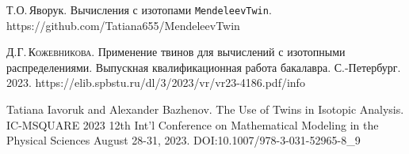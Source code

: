 \documentclass[a5paper,openany]{book}
\begin{document}
\begin{thebibliography}{99}
		
		
		

		
			Т.О.\,Яворук.	Вычисления с изотопами		{\tt MendeleevTwin}. https://github.com/Tatiana655/MendeleevTwin
		
		
		
		
		 \textsc{Д.Г.\,Кожевникова.} Применение твинов для вычислений с изотопными распределениями.  Выпускная квалификационная работа бакалавра. С.-Петербург. 2023. 	https://elib.spbstu.ru/dl/3/2023/vr/vr23-4186.pdf/info
		
 Tatiana Iavoruk and Alexander Bazhenov. The Use of Twins in Isotopic Analysis.
IC-MSQUARE 2023 12th Int'l Conference on Mathematical Modeling in the Physical Sciences August 28-31, 2023. DOI:10.1007/978-3-031-52965-8\_9
		
	\end{thebibliography}
	\raggedright\small\printindex 
	
\end{document}
